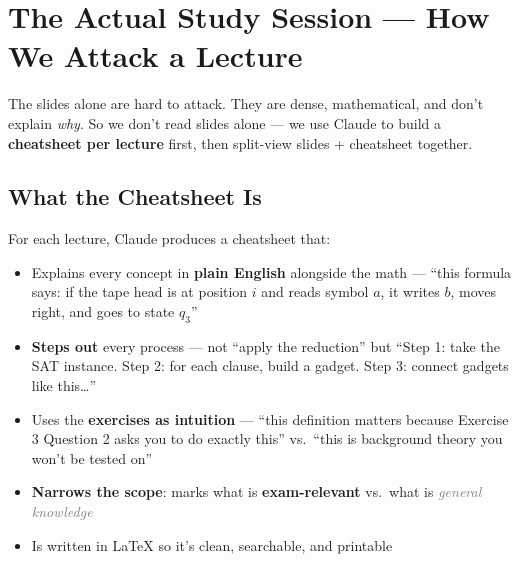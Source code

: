 \documentclass[11pt,a4paper]{article}
\begin{document}
\vspace{0.5em}

\begin{center}
\end{center}

\vspace{1em}

\section{The Actual Study Session --- How We Attack a Lecture}

The slides alone are hard to attack. They are dense, mathematical, and don't explain \textit{why}. So we don't read slides alone --- we use Claude to build a \textbf{cheatsheet per lecture} first, then split-view slides + cheatsheet together.

\subsection{What the Cheatsheet Is}

For each lecture, Claude produces a cheatsheet that:
\begin{itemize}[nosep]
\item Explains every concept in \textbf{plain English} alongside the math --- ``this formula says: if the tape head is at position $i$ and reads symbol $a$, it writes $b$, moves right, and goes to state $q_3$''
\item \textbf{Steps out} every process --- not ``apply the reduction'' but ``Step 1: take the SAT instance. Step 2: for each clause, build a gadget. Step 3: connect gadgets like this\ldots''
\item Uses the \textbf{exercises as intuition} --- ``this definition matters because Exercise 3 Question 2 asks you to do exactly this'' vs.\ ``this is background theory you won't be tested on''
\item \textbf{Narrows the scope}: marks what is \textcolor{accolor}{\textbf{exam-relevant}} vs.\ what is \textcolor{gray}{\textit{general knowledge}}
\item Is written in LaTeX so it's clean, searchable, and printable
\end{itemize}
\end{document}
